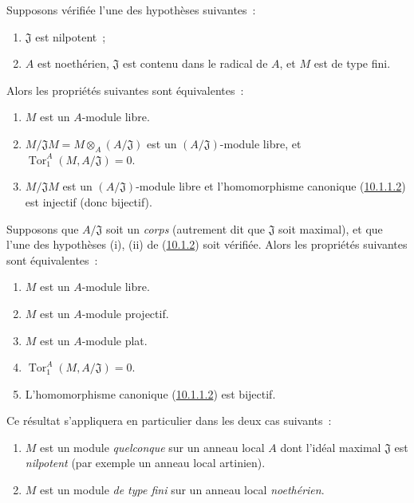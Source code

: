 \begin{env}[10.1.2]
\label{0.10.1.2-fr}
Supposons vérifiée l'une des hypothèses suivantes~:
\begin{enumerate}
  \item[(i)] $\mathfrak{J}$ est nilpotent~;
  \item[(ii)] $A$ est noethérien, $\mathfrak{J}$ est contenu dans le radical de
    $A$, et $M$ est de type fini.
\end{enumerate}
Alors les propriétés suivantes sont équivalentes~:
\begin{enumerate}
  \item[$a)$] $M$ est un $A$-module libre.
  \item[$b)$] $M/\mathfrak{J}M=M\otimes_A(A/\mathfrak{J})$ est un
    $(A/\mathfrak{J})$-module libre, et
    $\operatorname{Tor}_1^A(M,A/\mathfrak{J})=0$.
  \item[$c)$] $M/\mathfrak{J}M$ est un $(A/\mathfrak{J})$-module libre et
    l'homomorphisme canonique (\hyperref[0.10.1.1.2-fr]{10.1.1.2}) est
    injectif (donc bijectif).
\end{enumerate}
\end{env}

\begin{env}[10.1.3]
\label{0.10.1.3-fr}
Supposons que $A/\mathfrak{J}$ soit un \emph{corps} (autrement dit que
$\mathfrak{J}$ soit maximal), et que l'une des hypothèses (i), (ii) de
(\hyperref[0.10.1.2-fr]{10.1.2}) soit vérifiée. Alors les propriétés suivantes
sont équivalentes~:
\begin{enumerate}
  \item[$a)$] $M$ est un $A$-module libre.
  \item[$b)$] $M$ est un $A$-module projectif.
  \item[$c)$] $M$ est un $A$-module plat.
  \item[$d)$] $\operatorname{Tor}_1^A(M,A/\mathfrak{J})=0$.
  \item[$e)$] L'homomorphisme canonique
    (\hyperref[0.10.1.1.2-fr]{10.1.1.2}) est bijectif.
\end{enumerate}
Ce résultat s'appliquera en particulier dans les deux cas suivants~:
\begin{enumerate}
  \item[(i)] $M$ est un module \emph{quelconque} sur un anneau local $A$ dont
    l'idéal maximal $\mathfrak{J}$ est \emph{nilpotent} (par exemple un anneau
    local artinien).
  \item[(ii)] $M$ est un module \emph{de type fini} sur un anneau local
    \emph{noethérien}.
\end{enumerate}
\end{env}

